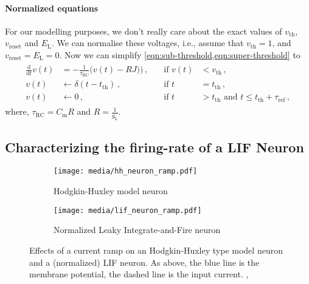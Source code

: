 \documentclass[10pt,letterpaper,oneside]{article}
\begin{document}

\paragraph{Normalized equations}
For our modelling purposes, we don't really care about the exact values of $v_\mathrm{th}$, $v_\mathrm{reset}$ and $E_\mathrm{L}$. We can normalise these voltages, i.e., assume that $v_\mathrm{th} = 1$, and $v_\mathrm{reset} = E_\mathrm{L} = 0$. Now we can simplify \cref{eqn:sub-threshold,eqn:super-threshold} to
\begin{align}
	\begin{aligned}
		\frac{\mathrm{d}}{\mathrm{d}t} v(t) &= -\frac{1}{\tau_\mathrm{RC}} \big( v(t) - RJ \big)
		\big) \,, \quad &\text{if } v(t) &< v_\mathrm{th}\,, \\
		v(t) &\gets \delta(t - t_\mathrm{th}) \,, &\text{if } t &= t_\mathrm{th} \,,\\
v(t) &\gets 0 \,, &\text{if } t &> t_\mathrm{th} \text{ and } t \leq t_\mathrm{th} + \tau_\mathrm{ref} \,,
	\end{aligned}
	\label{eqn:sub-threshold-normalised}
\end{align}
where, $\tau_\mathrm{RC} = C_\mathrm{m} R$ and $R = \frac{1}{g_\mathrm{L}}$.

\subsection{Characterizing the firing-rate of a LIF Neuron}

\begin{figure}[t]
	\begin{subfigure}{\textwidth}
		\centering
		\texttt{[image: media/hh\_neuron\_ramp.pdf]}
		\caption{Hodgkin-Huxley model neuron}
	\end{subfigure}
	\begin{subfigure}{\textwidth}
		\centering
		\texttt{[image: media/lif\_neuron\_ramp.pdf]}
		\caption{Normalized Leaky Integrate-and-Fire neuron}
	\end{subfigure}
	\caption{Effects of a current ramp on an Hodgkin-Huxley type model neuron and a (normalized) LIF neuron. As above, the blue line is the membrane potential, the dashed line is the input current. , }
	\label{fig:current_ramp}
\end{figure}
\end{document}

